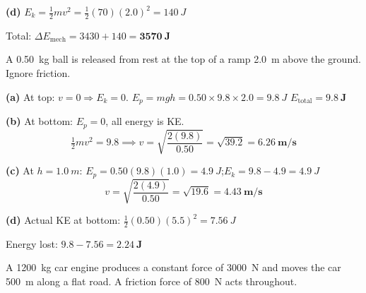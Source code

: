 \documentclass[addpoints]{exam}
\begin{document}
\begin{questions}
\begin{solution}[9cm]
\textbf{(d)} $E_k = \tfrac{1}{2}mv^2 = \tfrac{1}{2}(70)(2.0)^2 = \SI{140}{J}$

Total: $\Delta E_\text{mech} = 3430 + 140 = \mathbf{\SI{3570}{J}}$
\end{solution}

\question A \SI{0.50}{kg} ball is released from rest at the top of a ramp \SI{2.0}{m}
above the ground. Ignore friction.
\begin{solution}[9cm]
\textbf{(a)} At top: $v=0 \Rightarrow E_k = 0$.
$E_p = mgh = 0.50 \times 9.8 \times 2.0 = \SI{9.8}{J}$
$E_\text{total} = \mathbf{\SI{9.8}{J}}$

\textbf{(b)} At bottom: $E_p = 0$, all energy is KE.
\[
\tfrac{1}{2}mv^2 = 9.8 \implies v = \sqrt{\frac{2(9.8)}{0.50}} = \sqrt{39.2}
= \mathbf{\SI{6.26}{m/s}}
\]

\textbf{(c)} At $h = \SI{1.0}{m}$: $E_p = 0.50(9.8)(1.0) = \SI{4.9}{J}$;\quad $E_k = 9.8 - 4.9 = \SI{4.9}{J}$
\[
v = \sqrt{\frac{2(4.9)}{0.50}} = \sqrt{19.6} = \mathbf{\SI{4.43}{m/s}}
\]

\textbf{(d)} Actual KE at bottom: $\tfrac{1}{2}(0.50)(5.5)^2 = \SI{7.56}{J}$

Energy lost: $9.8 - 7.56 = \mathbf{\SI{2.24}{J}}$
\end{solution}

\question A \SI{1200}{kg} car engine produces a constant force of \SI{3000}{N} and
moves the car \SI{500}{m} along a flat road. A friction force of \SI{800}{N} acts
throughout.
\begin{parts}

\end{parts}
\end{questions}
\end{document}
